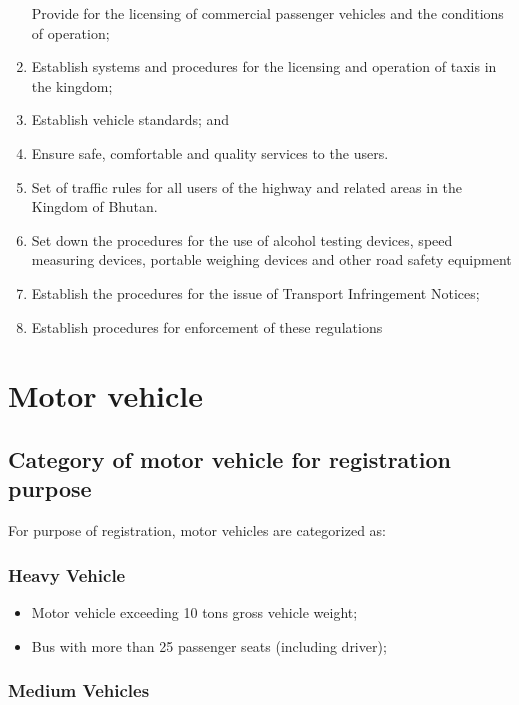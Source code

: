 \documentclass[
]{book}
\providecommand{\tightlist}{%
  \setlength{\itemsep}{0pt}\setlength{\parskip}{0pt}}
\begin{document}
\begin{enumerate}
  Provide for the licensing of commercial passenger vehicles and the conditions of operation;
\item
  Establish systems and procedures for the licensing and operation of taxis in the kingdom;
\item
  Establish vehicle standards; and
\item
  Ensure safe, comfortable and quality services to the users.
\item
  Set of traffic rules for all users of the highway and related areas in the Kingdom of Bhutan.
\item
  Set down the procedures for the use of alcohol testing devices, speed measuring devices, portable weighing devices and other road safety equipment
\item
  Establish the procedures for the issue of Transport Infringement Notices;
\item
  Establish procedures for enforcement of these regulations
\end{enumerate}

\hypertarget{motor-vehicle}{%
\chapter{Motor vehicle}\label{motor-vehicle}}

\hypertarget{category-of-motor-vehicle-for-registration-purpose}{%
\section{Category of motor vehicle for registration purpose}\label{category-of-motor-vehicle-for-registration-purpose}}

For purpose of registration, motor vehicles are categorized as:

\hypertarget{heavy-vehicle}{%
\subsection{Heavy Vehicle}\label{heavy-vehicle}}

\begin{itemize}
\tightlist
\item
  Motor vehicle exceeding 10 tons gross vehicle weight;
\item
  Bus with more than 25 passenger seats (including driver);
\end{itemize}

\hypertarget{medium-vehicles}{%
\subsection{Medium Vehicles}\label{medium-vehicles}}
\end{document}
